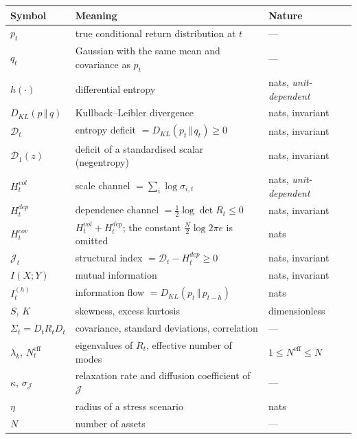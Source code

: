 \documentclass[11pt]{article}
\theoremstyle{definition}
\theoremstyle{remark}
\newcommand{\JJ}{\mathcal{J}}
\newcommand{\DD}{\mathcal{D}}
\newcommand{\Dun}{\mathcal{D}_1}
\newcommand{\KL}[2]{D_{KL}\!\left(#1\,\Vert\,#2\right)}
\begin{document}
\begin{center}
\small
\begin{tabular}{@{}lll@{}}
\toprule
Symbol & Meaning & Nature \\
\midrule
$p_t$ & true conditional return distribution at $t$ & --- \\
$q_t$ & Gaussian with the same mean and covariance as $p_t$ & --- \\
$h(\cdot)$ & differential entropy & nats, \emph{unit-dependent} \\
$\KL{p}{q}$ & Kullback--Leibler divergence & nats, invariant \\
$\DD_t$ & entropy deficit $=\KL{p_t}{q_t}\ge0$ & nats, invariant \\
$\Dun(z)$ & deficit of a standardised scalar (negentropy) & nats, invariant \\
$H^{vol}_t$ & scale channel $=\sum_i\log\sigma_{i,t}$ & nats, \emph{unit-dependent} \\
$H^{dep}_t$ & dependence channel $=\tfrac12\log\det R_t\le0$ & nats, invariant \\
$H^{cov}_t$ & $H^{vol}_t+H^{dep}_t$; the constant $\tfrac N2\log2\pi e$ is omitted & nats \\
$\JJ_t$ & structural index $=\DD_t-H^{dep}_t\ge0$ & nats, invariant \\
$I(X;Y)$ & mutual information & nats, invariant \\
$I^{(h)}_t$ & information flow $=\KL{p_t}{p_{t-h}}$ & nats \\
$S$, $K$ & skewness, excess kurtosis & dimensionless \\
$\Sigma_t=D_tR_tD_t$ & covariance, standard deviations, correlation & --- \\
$\lambda_k$, $N^{\text{eff}}_t$ & eigenvalues of $R_t$, effective number of modes & $1\le N^{\text{eff}}\le N$ \\
$\kappa$, $\sigma_\JJ$ & relaxation rate and diffusion coefficient of $\JJ$ & --- \\
$\eta$ & radius of a stress scenario & nats \\
$N$ & number of assets & --- \\
\bottomrule
\end{tabular}
\end{center}
\end{document}
